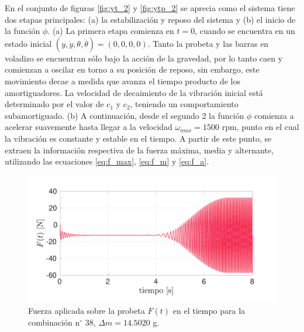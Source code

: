 En el conjunto de figuras \ref{fig:yt_2} y \ref{fig:ytp_2} se aprecia como el sistema tiene dos etapas principales: (a) la estabilización y reposo del sistema y (b) el inicio de la función $\phi$. (a) La primera etapa comienza en $t=0$, cuando se encuentra en un estado inicial $(y, \dot{y}, \theta, \dot{\theta}) = (0,0,0,0)$. Tanto la probeta y las barras en voladizo se encuentran sólo bajo la acción de la gravedad, por lo tanto caen y comienzan a oscilar en torno a su posición de reposo, sin embargo, este movimiento decae a medida que avanza el tiempo producto de los amortiguadores. La velocidad de decaimiento de la vibración inicial está determinado por el valor de $c_1$ y $c_2$, teniendo un comportamiento subamortiguado. (b) A continuación, desde el segundo 2 la función $\phi$ comienza a acelerar suavemente hasta llegar a la velocidad $\omega_{max} = 1500$ rpm, punto en el cual la vibración es constante y estable en el tiempo. A partir de este punto, se extraen la información respectiva de la fuerza máxima, media y alternante, utilizando las ecuaciones \ref{eq:f_max}, \ref{eq:f_m} y \ref{eq:f_a}. 

\begin{figure}[h]
\centering
\includegraphics[width=0.95\linewidth, trim={0cm 1cm 2cm 1cm},clip]{Imagenes/f_2.pdf}
\caption{Fuerza aplicada sobre la probeta $F(t)$ en el tiempo para la combinación n$^{\circ}$ 38, $\Delta m = 14.5020$ g.}
\label{fig:f_2}
\end{figure}

